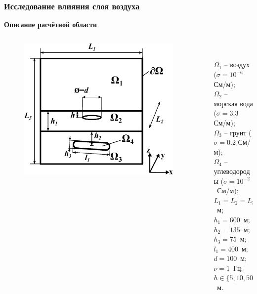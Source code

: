 \documentclass[aspectratio=43,usepdftitle=false]{beamer}
\newcommand{\MakeTitle}[1]{\frametitle{\hspace{1.5em}\textbf{#1} \hfill \insertframenumber{} }}
\begin{document}
\begin{frame}
	\MakeTitle{Исследование влияния слоя воздуха}
	\textbf{Описание расчётной области}
	\begin{columns}[t,totalwidth=\linewidth]
		\begin{column}{.5\linewidth}
			\vspace{-3em}
			\begin{figure}[ht]
				\includegraphics[width=1.1\textwidth,height=1.1\textheight,keepaspectratio]{area_3layers_shift_3.eps}
			\end{figure}
		\end{column}
		\begin{column}{.04\linewidth}
		\end{column}
		\begin{column}{.8\linewidth}
			\\
			\begin{small}
			$\Omega_1$ -- воздух ($\sigma=10^{-6}$ См/м); \\
			$\Omega_2$ -- морская вода ($\sigma=3.3$ См/м); \\
			$\Omega_3$ -- грунт ($\sigma=0.2$ См/м); \\
			$\Omega_4$ -- углеводороды ($\sigma=10^{-2}$~См/м); \\
			$L_1 = L_2 = L_3 = 6000$~м; \\
			$h_1=600$~м; $h_2=135$~м; \\
			$h_3=75$~м; $l_1=400$~м; \\
			$d=100$~м; $\nu=1$~Гц; \\
			$h \in \{ 5, 10, 50, 100, 200, 300, 400 \}$~м.
			\end{small}
		\end{column}
	\end{columns}
\end{frame}
\end{document}
